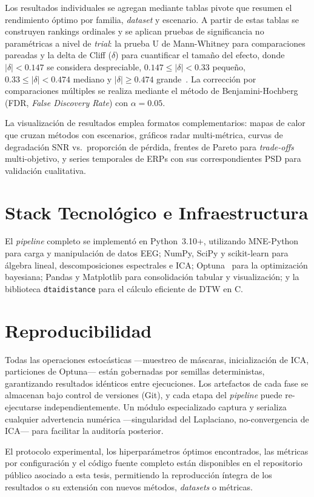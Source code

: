 Los resultados individuales se agregan mediante tablas pivote que resumen el rendimiento óptimo por familia, \textit{dataset} y escenario. A partir de estas tablas se construyen rankings ordinales y se aplican pruebas de significancia no paramétricas a nivel de \textit{trial}: la prueba U de Mann-Whitney para comparaciones pareadas y la delta de Cliff ($\delta$) para cuantificar el tamaño del efecto, donde $|\delta| < 0.147$ se considera despreciable, $0.147 \leq |\delta| < 0.33$ pequeño, $0.33 \leq |\delta| < 0.474$ mediano y $|\delta| \geq 0.474$ grande~\cite{cliff1993dominance}. La corrección por comparaciones múltiples se realiza mediante el método de Benjamini-Hochberg (FDR, \textit{False Discovery Rate}) con $\alpha = 0.05$.

La visualización de resultados emplea formatos complementarios: mapas de calor que cruzan métodos con escenarios, gráficos radar multi-métrica, curvas de degradación SNR vs.\ proporción de pérdida, frentes de Pareto para \textit{trade-offs} multi-objetivo, y series temporales de ERPs con sus correspondientes PSD para validación cualitativa.

\section{Stack Tecnológico e Infraestructura}

El \textit{pipeline} completo se implementó en Python~3.10+, utilizando MNE-Python~\cite{gramfort2013meg} para carga y manipulación de datos EEG; NumPy, SciPy y scikit-learn para álgebra lineal, descomposiciones espectrales e ICA; Optuna~\cite{akiba2019optuna} para la optimización bayesiana; Pandas y Matplotlib para consolidación tabular y visualización; y la biblioteca \texttt{dtaidistance} para el cálculo eficiente de DTW en C.

\section{Reproducibilidad}

Todas las operaciones estocásticas —muestreo de máscaras, inicialización de ICA, particiones de Optuna— están gobernadas por semillas deterministas, garantizando resultados idénticos entre ejecuciones. Los artefactos de cada fase se almacenan bajo control de versiones (Git), y cada etapa del \textit{pipeline} puede re-ejecutarse independientemente. Un módulo especializado captura y serializa cualquier advertencia numérica —singularidad del Laplaciano, no-convergencia de ICA— para facilitar la auditoría posterior.

El protocolo experimental, los hiperparámetros óptimos encontrados, las métricas por configuración y el código fuente completo están disponibles en el repositorio público asociado a esta tesis, permitiendo la reproducción íntegra de los resultados o su extensión con nuevos métodos, \textit{datasets} o métricas.
